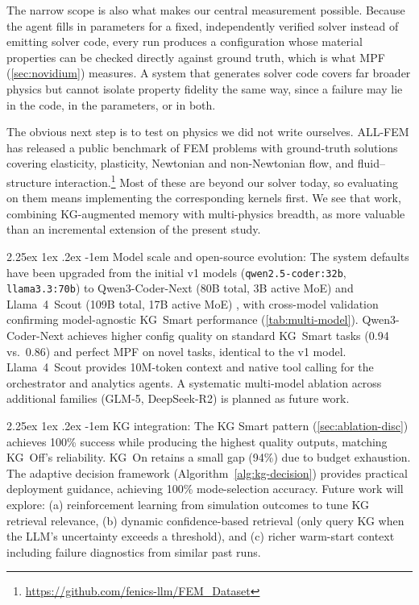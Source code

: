 \documentclass[preprint,review,12pt]{elsarticle}
\makeatletter
\renewcommand\paragraph{\@startsection{paragraph}{4}{\z@}%
  {2.25ex \@plus1ex \@minus.2ex}%
  {-1em}%
  {\normalfont\normalsize\bfseries}}
\newif\ifrevisionsvisible
\newcommand{\revised}[1]{%
  \ifrevisionsvisible\textcolor{revisionred}{#1}\else#1\fi}
\makeatother
\begin{document}
\revised{The narrow scope is also what makes our central measurement
possible.  Because the agent fills in parameters for a fixed,
independently verified solver instead of emitting solver code, every run
produces a configuration whose material properties can be checked
directly against ground truth, which is what MPF (\cref{sec:novidium})
measures.  A system that generates solver code covers far broader physics
but cannot isolate property fidelity the same way, since a failure may
lie in the code, in the parameters, or in both.}

\revised{The obvious next step is to test on physics we did not write
ourselves.  ALL-FEM \citep{deotale2026allfem} has released a public
benchmark of FEM problems with ground-truth solutions covering
elasticity, plasticity, Newtonian and non-Newtonian flow, and
fluid--structure
interaction.\footnote{\url{https://github.com/fenics-llm/FEM_Dataset}}
Most of these are beyond our solver today, so evaluating on them means
implementing the corresponding kernels first.  We see that work,
combining KG-augmented memory with multi-physics breadth, as more
valuable than an incremental extension of the present study.}

\paragraph{Model scale and open-source evolution:}
The system defaults have been upgraded from the initial v1 models
(\texttt{qwen2.5-coder:32b}, \texttt{llama3.3:70b}) to
Qwen3-Coder-Next (80B total, 3B active MoE) \citep{qwen3coder2026}
and Llama~4~Scout (109B total, 17B active MoE) \citep{llama4}, with
cross-model validation confirming model-agnostic KG~Smart performance
(\cref{tab:multi-model}).  Qwen3-Coder-Next achieves higher config
quality on standard KG~Smart tasks (0.94 vs.\ 0.86) and perfect MPF on
novel tasks, identical to the v1 model.  Llama~4~Scout provides 10M-token
context and native tool calling for the orchestrator and analytics agents.
A systematic multi-model ablation across additional families (GLM-5,
DeepSeek-R2) is planned as future work.

\paragraph{KG integration:}
The KG Smart pattern (\cref{sec:ablation-disc}) achieves 100\% success
while producing the highest quality outputs, matching KG~Off's
reliability.  KG~On retains a small gap (94\%) due to budget exhaustion.
The adaptive decision framework (Algorithm~\ref{alg:kg-decision}) provides
practical deployment guidance, achieving 100\% mode-selection accuracy.
Future work will explore:
(a) reinforcement learning from simulation outcomes to tune KG retrieval
relevance, (b) dynamic confidence-based retrieval (only query KG when the
LLM's uncertainty exceeds a threshold), and (c) richer warm-start context
including failure diagnostics from similar past runs.
\end{document}
